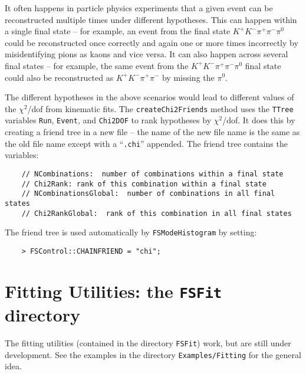 \documentclass[11pt]{article}
\begin{document}
It often happens in particle physics experiments that a given event can be reconstructed multiple times under different hypotheses.  This can happen within a single final state -- for example, an event from the final state $K^+K^-\pi^+\pi^-\pi^0$ could be reconstructed once correctly and again one or more times incorrectly by misidentifying pions as kaons and vice versa.  It can also happen across several final states -- for example, the same event from the $K^+K^-\pi^+\pi^-\pi^0$ final state could also be reconstructed as $K^+K^-\pi^+\pi^-$ by missing the $\pi^0$.  

The different hypotheses in the above scenarios would lead to different values of the $\chi^2$/dof from kinematic fits.  The {\tt createChi2Friends} method uses the {\tt TTree} variables {\tt Run}, {\tt Event}, and {\tt Chi2DOF} to rank hypotheses by $\chi^2$/dof.  It does this by creating a friend tree in a new file -- the name of the new file name is the same as the old file name except with a ``{\tt .chi}'' appended.  The friend tree contains the variables:
\begin{verbatim}
    // NCombinations:  number of combinations within a final state
    // Chi2Rank: rank of this combination within a final state
    // NCombinationsGlobal:  number of combinations in all final states
    // Chi2RankGlobal:  rank of this combination in all final states
\end{verbatim}
The friend tree is used automatically by {\tt FSModeHistogram} by setting:
\begin{verbatim}
    > FSControl::CHAINFRIEND = "chi";
\end{verbatim}


\section{Fitting Utilities:  the {\tt FSFit} directory}

The fitting utilities (contained in the directory {\tt FSFit}) work, but are still under development.  See the examples in the directory {\tt Examples/Fitting} for the general idea.
\end{document}
